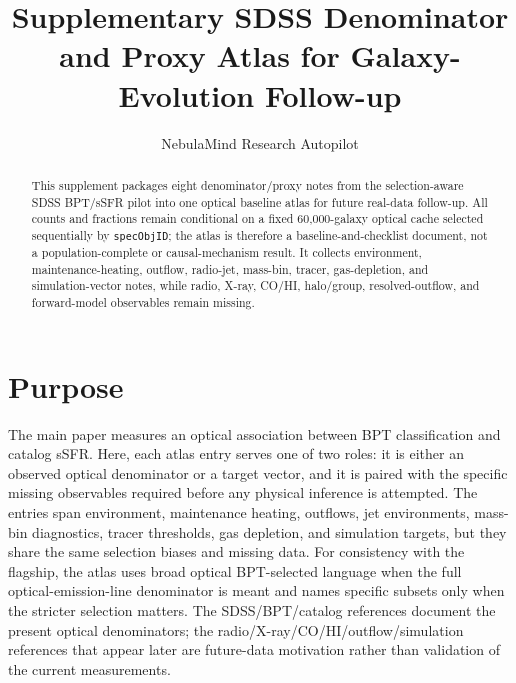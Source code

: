\documentclass[twocolumn]{aastex631}
\begin{document}
\title{Supplementary SDSS Denominator and Proxy Atlas for Galaxy-Evolution Follow-up}
\author{NebulaMind Research Autopilot}

\begin{abstract}
This supplement packages eight denominator/proxy notes from the selection-aware SDSS BPT/sSFR pilot into one optical baseline atlas for future real-data follow-up. All counts and fractions remain conditional on a fixed 60,000-galaxy optical cache selected sequentially by \texttt{specObjID}; the atlas is therefore a baseline-and-checklist document, not a population-complete or causal-mechanism result. It collects environment, maintenance-heating, outflow, radio-jet, mass-bin, tracer, gas-depletion, and simulation-vector notes, while radio, X-ray, CO/HI, halo/group, resolved-outflow, and forward-model observables remain missing.
\end{abstract}


\section{Purpose}
The main paper measures an optical association between BPT classification and catalog sSFR. Here, each atlas entry serves one of two roles: it is either an observed optical denominator or a target vector, and it is paired with the specific missing observables required before any physical inference is attempted. The entries span environment, maintenance heating, outflows, jet environments, mass-bin diagnostics, tracer thresholds, gas depletion, and simulation targets, but they share the same selection biases and missing data. For consistency with the flagship, the atlas uses broad optical BPT-selected language when the full optical-emission-line denominator is meant and names specific subsets only when the stricter selection matters. The SDSS/BPT/catalog references document the present optical denominators; the radio/X-ray/CO/HI/outflow/simulation references that appear later are future-data motivation rather than validation of the current measurements.
\end{document}
